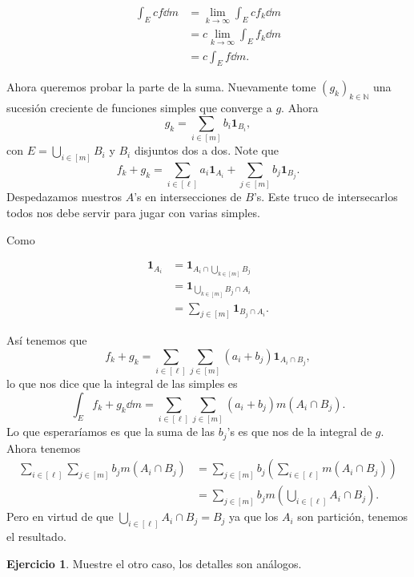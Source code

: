 \documentclass[12pt]{article}
\theoremstyle{plain}
\theoremstyle{definition}
\newtheorem{Ej}[Th]{Ejercicio}
\theoremstyle{remark}
\numberwithin{equation}{section}
\newcommand{\bN}{\mathbb{N}}        %
\newcommand{\ind}{\mathbf{1}}       %
\renewcommand{\:}{\colon}           %
\newcommand{\bonj}[1]{\left\lbrack#1\right\rbrack}
\begin{document}
\begin{multicols}{2}
\begin{ptcbp}
\begin{align*}
  \int_Ecf\dd m &=\lim_{k\to\infty}\int_Ecf_k\dd m\\
  &=c\lim_{k\to\infty}\int_Ef_k\dd m\\
  &=c\int_Ef\dd m.
\end{align*}

Ahora queremos probar la parte de la suma. Nuevamente tome $(g_k)_{k\in\bN}$ una sucesión creciente de funciones simples que converge a $g$. Ahora
$$g_k=\sum_{i\in\bonj{m}}b_i\ind_{B_i},$$
con $E=\bigcup_{i\in\bonj{m}}B_i$ y $B_i$ disjuntos dos a dos. Note que
$$f_k+g_k=\sum_{i\in\bonj{\ell}}a_i\ind_{A_i}+\sum_{j\in\bonj{m}}b_j\ind_{B_j}.$$
Despedazamos nuestros $A$'s en intersecciones de $B$'s. Este truco de intersecarlos todos nos debe servir para jugar con varias simples.\par
Como

\begin{align*}
  \ind_{A_i} & =\ind_{A_i\cap\bigcup_{k\in\bonj{m}}B_j}\\
  &=\ind_{\bigcup_{k\in\bonj{m}}B_j\cap A_i}\\
  &=\sum_{j\in\bonj{m}}\ind_{B_j\cap A_i}.
\end{align*}

Así tenemos que
$$f_k+g_k=\sum_{i\in\bonj{\ell}}\sum_{j\in\bonj{m}}(a_i+b_j)\ind_{A_i\cap B_j},$$
lo que nos dice que la integral de las simples es
$$\int_Ef_k+g_k\dd m= \sum_{i\in\bonj{\ell}}\sum_{j\in\bonj{m}}(a_i+b_j)m(A_i\cap B_j).$$
Lo que esperaríamos es que la suma de las $b_j$'s es que nos de la integral de $g$. Ahora tenemos
\begin{align*}
   \sum_{i\in\bonj{\ell}}\sum_{j\in\bonj{m}}b_jm(A_i\cap B_j)&=\sum_{j\in\bonj{m}}b_j\left(\sum_{i\in\bonj{\ell}}m(A_i\cap B_j)\right)\\
   &=\sum_{j\in\bonj{m}}b_jm\left(\bigcup_{i\in\bonj{\ell}}A_i\cap B_j\right).
\end{align*}
Pero en virtud de que $\bigcup_{i\in\bonj{\ell}}A_i\cap B_j=B_j$ ya que los $A_i$ son partición, tenemos el resultado.
\end{ptcbp}

\begin{Ej}
  Muestre el otro caso, los detalles son análogos.
\end{Ej}


\end{multicols}
\end{document}
